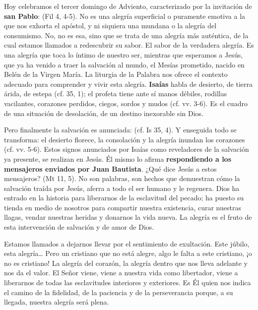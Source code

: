 				\begin{body}
					Hoy celebramos el tercer domingo de Adviento, caracterizado por la invitación de \textbf{san Pablo}:  (Fil 4, 4-5). No es una alegría superficial o puramente emotiva a la que nos exhorta el apóstol, y ni siquiera una mundana o la alegría del consumismo. No, no es esa, sino que se trata de una alegría más auténtica, de la cual estamos llamados a redescubrir su sabor. El sabor de la verdadera alegría. Es una alegría que toca lo íntimo de nuestro ser, mientras que esperamos a Jesús, que ya ha venido a traer la salvación al mundo, el Mesías prometido, nacido en Belén de la Virgen María. La liturgia de la Palabra nos ofrece el contexto adecuado para comprender y vivir esta alegría. \textbf{Isaías} habla de desierto, de tierra árida, de estepa (cf. 35, 1); el profeta tiene ante sí manos débiles, rodillas vacilantes, corazones perdidos, ciegos, sordos y mudos (cf. vv. 3-6). Es el cuadro de una situación de desolación, de un destino inexorable sin Dios.
					
					Pero finalmente la salvación es anunciada:  (cf. Is 35, 4). Y enseguida todo se transforma: el desierto florece, la consolación y la alegría inundan los corazones (cf. vv. 5-6). Estos signos anunciados por Isaías como reveladores de la salvación ya presente, se realizan en Jesús. Él mismo lo afirma \textbf{respondiendo a los mensajeros enviados por Juan Bautista}. ¿Qué dice Jesús a estos mensajeros?  (Mt 11, 5). No son palabras, son hechos que demuestran cómo la salvación traída por Jesús, aferra a todo el ser humano y le regenera. Dios ha entrado en la historia para liberarnos de la esclavitud del pecado; ha puesto su tienda en medio de nosotros para compartir nuestra existencia, curar nuestras llagas, vendar nuestras heridas y donarnos la vida nueva. La alegría es el fruto de esta intervención de salvación y de amor de Dios.
					
					Estamos llamados a dejarnos llevar por el sentimiento de exultación. Este júbilo, esta alegría\ldots{} Pero un cristiano que no está alegre, algo le falta a este cristiano, ¡o no es cristiano! La alegría del corazón, la alegría dentro que nos lleva adelante y nos da el valor. El Señor viene, viene a nuestra vida como libertador, viene a liberarnos de todas las esclavitudes interiores y exteriores. Es Él quien nos indica el camino de la fidelidad, de la paciencia y de la perseverancia porque, a su llegada, nuestra alegría será plena.
					

\end{body}
